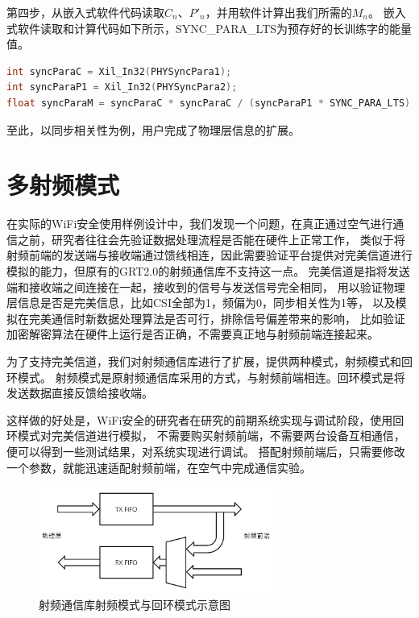 	第四步，从嵌入式软件代码读取$C_n$、$P'_n$，并用软件计算出我们所需的$M_n$。
	嵌入式软件读取和计算代码如下所示，SYNC\_PARA\_LTS为预存好的长训练字的能量值。
	\begin{lstlisting}[language={C}]
int syncParaC = Xil_In32(PHYSyncPara1);
int syncParaP1 = Xil_In32(PHYSyncPara2);
float syncParaM = syncParaC * syncParaC / (syncParaP1 * SYNC_PARA_LTS);
	\end{lstlisting}

	至此，以同步相关性为例，用户完成了物理层信息的扩展。

	\section{多射频模式}\label{sec:grtsec_loopback}
	在实际的WiFi安全使用样例设计中，我们发现一个问题，在真正通过空气进行通信之前，研究者往往会先验证数据处理流程是否能在硬件上正常工作，
	类似于将射频前端的发送端与接收端通过馈线相连，因此需要验证平台提供对完美信道进行模拟的能力，但原有的GRT2.0的射频通信库不支持这一点。
	完美信道是指将发送端和接收端之间连接在一起，接收到的信号与发送信号完全相同，
	用以验证物理层信息是否是完美信息，比如CSI全部为1，频偏为0，同步相关性为1等，
	以及模拟在完美通信时新数据处理算法是否可行，排除信号偏差带来的影响，
	比如验证加密解密算法在硬件上运行是否正确，不需要真正地与射频前端连接起来。

	为了支持完美信道，我们对射频通信库进行了扩展，提供两种模式，射频模式和回环模式。
	射频模式是原射频通信库采用的方式，与射频前端相连。回环模式是将发送数据直接反馈给接收端。

	这样做的好处是，WiFi安全的研究者在研究的前期系统实现与调试阶段，使用回环模式对完美信道进行模拟，
	不需要购买射频前端，不需要两台设备互相通信，便可以得到一些测试结果，对系统实现进行调试。
	搭配射频前端后，只需要修改一个参数，就能迅速适配射频前端，在空气中完成通信实验。

		\begin{figure}
			\centering
			\includegraphics[width=0.7\textwidth]{img/rflib_loopback_mux.png}
			\caption{射频通信库射频模式与回环模式示意图}
			\label{fig:rflib_loopback_mux}
		\end{figure}

